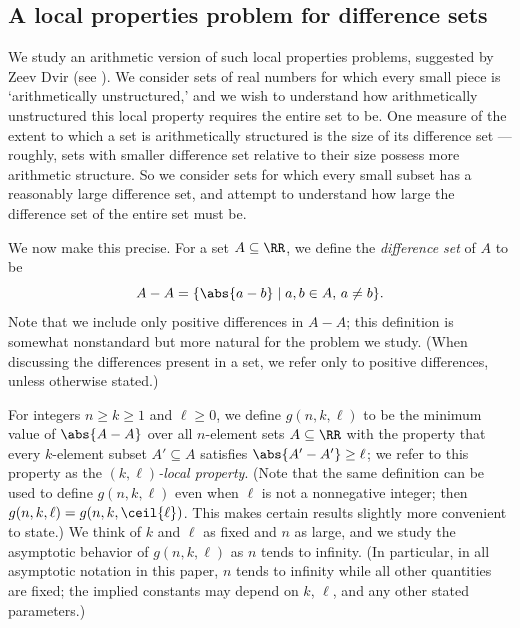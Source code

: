 \subsection{A local properties problem for difference sets}

We study an arithmetic version of such local properties problems, suggested by Zeev Dvir (see \cite{PS19}). We consider sets of real numbers for which every small piece is `arithmetically unstructured,' and we wish to understand how arithmetically unstructured this local property requires the entire set to be. One measure of the extent to which a set is arithmetically structured is the size of its difference set --- roughly, sets with smaller difference set relative to their size possess more arithmetic structure. So we consider sets for which every small subset has a reasonably large difference set, and attempt to understand how large the difference set of the entire set must be. 

We now make this precise. For a set $A \subseteq \RR$, we define the \emph{difference set} of $A$ to be \[A - A = \{\abs{a - b} \mid a, b \in A, \, a \neq b\}.\] Note that we include only positive differences in $A - A$; this definition is somewhat nonstandard but more natural for the problem we study. (When discussing the differences present in a set, we refer only to positive differences, unless otherwise stated.)

For integers $n \geq k \geq 1$ and $\ell \geq 0$, we define $g(n, k, \ell)$ to be the minimum value of $\abs{A - A}$ over all $n$-element sets $A \subseteq \RR$ with the property that every $k$-element subset $A' \subseteq A$ satisfies $\abs{A' - A'} \geq \ell$; we refer to this property as the \emph{$(k, \ell)$-local property}. (Note that the same definition can be used to define $g(n, k, \ell)$ even when $\ell$ is not a nonnegative integer; then $g(n, k, \ell) = g(n, k, \ceil{\ell})$. This makes certain results slightly more convenient to state.) We think of $k$ and $\ell$ as fixed and $n$ as large, and we study the asymptotic behavior of $g(n, k, \ell)$ as $n$ tends to infinity. (In particular, in all asymptotic notation in this paper, $n$ tends to infinity while all other quantities are fixed; the implied constants may depend on $k$, $\ell$, and any other stated parameters.)

